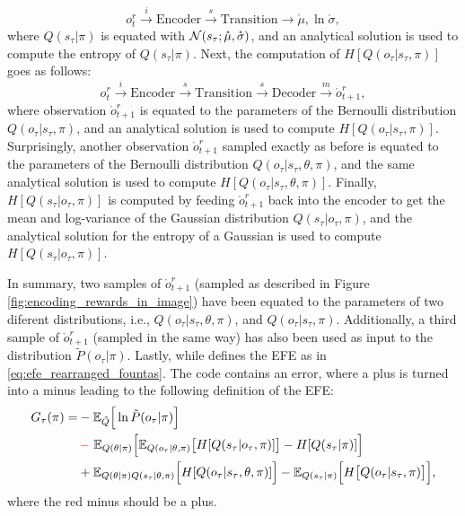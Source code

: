 \documentclass[twoside,11pt]{article}
\let\oldmathcal\mathcal
\renewcommand{\mathcal}[1]{%
  \IfSubStr{ABCDEFGHIJKLMNOPQRSTUVWXYZ}{#1}{\oldmathcal{#1}}{\mathdutchcal{#1}}
}
\begin{document}
$$o_t^r \overset{i}{\rightarrow} \text{Encoder} \overset{s}{\rightarrow} \text{Transition} \rightarrow \mathring{\mu}, \ln \mathring{\sigma},$$
where $Q(s_\tau|\pi)$ is equated with $\mathcal{N}(s_\tau;\mathring{\mu}, \mathring{\sigma})$, and an analytical solution is used to compute the entropy of $Q(s_\tau|\pi)$. Next, the computation of $H[Q(o_\tau|s_\tau, \pi)]$ goes as follows:
$$o_t^r \overset{i}{\rightarrow} \text{Encoder} \overset{s}{\rightarrow} \text{Transition} \overset{s}{\rightarrow} \text{Decoder} \overset{m}{\rightarrow} \mathring{o}^r_{t+1},$$
where observation $\mathring{o}^r_{t+1}$ is equated to the parameters of the Bernoulli distribution $Q(o_\tau|s_\tau, \pi)$, and an analytical solution is used to compute $H[Q(o_\tau|s_\tau, \pi)]$. Surprisingly, another observation $\mathring{o}^r_{t+1}$ sampled exactly as before is equated to the parameters of the Bernoulli distribution $Q(o_\tau|s_\tau,\theta,\pi)$, and the same analytical solution is used to compute $H[Q(o_\tau|s_\tau,\theta,\pi)]$. Finally, $H[Q(s_\tau|o_\tau, \pi)]$ is computed by feeding $\mathring{o}^r_{t+1}$ back into the encoder to get the mean and log-variance of the Gaussian distribution $Q(s_\tau|o_\tau, \pi)$, and the analytical solution for the entropy of a Gaussian is used to compute $H[Q(s_\tau|o_\tau, \pi)]$.

In summary, two samples of $\mathring{o}^r_{t+1}$ (sampled as described in Figure \ref{fig:encoding_rewards_in_image}) have been equated to the parameters of two diferent distributions, i.e., $Q(o_\tau|s_\tau,\theta,\pi)$, and $Q(o_\tau|s_\tau, \pi)$. Additionally, a third sample of $\mathring{o}^r_{t+1}$ (sampled in the same way) has also been used as input to the distribution $\tilde{P}(o_\tau|\pi)$. Lastly, while \citet{DeepAIwithMCMC} defines the EFE as in \eqref{eq:efe_rearranged_fountas}. The code contains an error, where a plus is turned into a minus leading to the following definition of the EFE:
\begin{align*}
G_{\tau}(\pi) = &- \mathbb{E}_{\tilde{Q}}\Big[ \ln \tilde{P}(o_\tau|\pi)\Big]\nonumber\\
&\,{\color{red}-} \,\, \mathbb{E}_{Q(\theta|\pi)}\Big[ \mathbb{E}_{Q(o_\tau|\theta,\pi)}\big[H[Q(s_\tau|o_\tau, \pi)]\big] - H[Q(s_\tau|\pi)] \Big]\nonumber\\
&+ \mathbb{E}_{Q(\theta|\pi)Q(s_\tau|\theta,\pi)}\Big[H[Q(o_\tau|s_\tau,\theta,\pi)] \Big] - \mathbb{E}_{Q(s_\tau|\pi)}\Big[ H\big[ Q(o_\tau|s_\tau, \pi) \big] \Big],
\end{align*}
where the red minus should be a plus.
\end{document}
